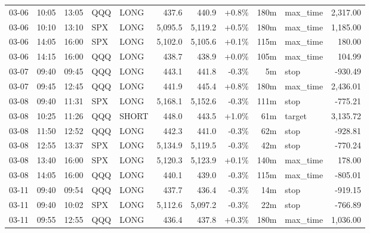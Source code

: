 \documentclass[11pt,a4paper,twoside]{article}
\begin{document}
\begin{center}
\begin{longtable}{>{\color{txtmain}}l l l l l r r r r >{\color{txtmain}}l r}
03-06 & 10:05 & 13:05 & QQQ & LONG & 437.6 & 440.9 & \textcolor{wingreen}{+0.8\%} & 180m & max\_time & \textcolor{wingreen}{2,317.00} \\
03-06 & 10:10 & 13:10 & SPX & LONG & 5,095.5 & 5,119.2 & \textcolor{wingreen}{+0.5\%} & 180m & max\_time & \textcolor{wingreen}{1,185.00} \\
03-06 & 14:05 & 16:00 & SPX & LONG & 5,102.0 & 5,105.6 & \textcolor{wingreen}{+0.1\%} & 115m & max\_time & \textcolor{wingreen}{180.00} \\
03-06 & 14:15 & 16:00 & QQQ & LONG & 438.7 & 438.9 & \textcolor{wingreen}{+0.0\%} & 105m & max\_time & \textcolor{wingreen}{104.99} \\
03-07 & 09:40 & 09:45 & QQQ & LONG & 443.1 & 441.8 & \textcolor{lossred}{-0.3\%} & 5m & stop & \textcolor{lossred}{-930.49} \\
03-07 & 09:45 & 12:45 & QQQ & LONG & 441.9 & 445.4 & \textcolor{wingreen}{+0.8\%} & 180m & max\_time & \textcolor{wingreen}{2,436.01} \\
03-08 & 09:40 & 11:31 & SPX & LONG & 5,168.1 & 5,152.6 & \textcolor{lossred}{-0.3\%} & 111m & stop & \textcolor{lossred}{-775.21} \\
03-08 & 10:25 & 11:26 & QQQ & SHORT & 448.0 & 443.5 & \textcolor{wingreen}{+1.0\%} & 61m & target & \textcolor{wingreen}{3,135.72} \\
03-08 & 11:50 & 12:52 & QQQ & LONG & 442.3 & 441.0 & \textcolor{lossred}{-0.3\%} & 62m & stop & \textcolor{lossred}{-928.81} \\
03-08 & 12:55 & 13:37 & SPX & LONG & 5,134.9 & 5,119.5 & \textcolor{lossred}{-0.3\%} & 42m & stop & \textcolor{lossred}{-770.24} \\
03-08 & 13:40 & 16:00 & SPX & LONG & 5,120.3 & 5,123.9 & \textcolor{wingreen}{+0.1\%} & 140m & max\_time & \textcolor{wingreen}{178.00} \\
03-08 & 14:05 & 16:00 & QQQ & LONG & 440.1 & 439.0 & \textcolor{lossred}{-0.3\%} & 115m & max\_time & \textcolor{lossred}{-805.01} \\
03-11 & 09:40 & 09:54 & QQQ & LONG & 437.7 & 436.4 & \textcolor{lossred}{-0.3\%} & 14m & stop & \textcolor{lossred}{-919.15} \\
03-11 & 09:40 & 10:02 & SPX & LONG & 5,112.6 & 5,097.2 & \textcolor{lossred}{-0.3\%} & 22m & stop & \textcolor{lossred}{-766.89} \\
03-11 & 09:55 & 12:55 & QQQ & LONG & 436.4 & 437.8 & \textcolor{wingreen}{+0.3\%} & 180m & max\_time & \textcolor{wingreen}{1,036.00} \\

\end{longtable}
\end{center}
\end{document}
